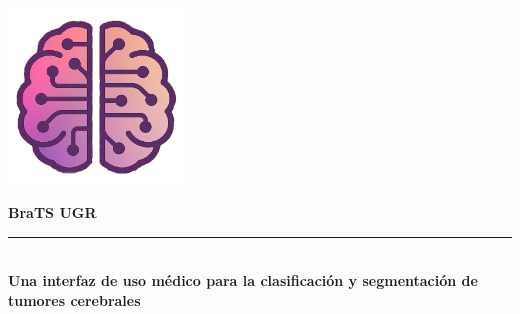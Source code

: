 \begin{titlepage}
 
 
\setlength{\centeroffset}{-0.5\oddsidemargin}
\addtolength{\centeroffset}{0.5\evensidemargin}
\thispagestyle{empty}

\noindent\hspace*{\centeroffset}\begin{minipage}{\textwidth}

\centering

% 

 \vspace{3.3cm}

\includegraphics[width=0.35\textwidth]{imagenes/icono.png}
 \vspace{0.5cm}


{\Huge\bfseries BraTS UGR\\
}
\noindent\rule[-1ex]{\textwidth}{3pt}\\[3.5ex]
{\large\bfseries Una interfaz de uso médico para la clasificación y segmentación de tumores cerebrales \\[4cm]}
\end{minipage}

\vspace{2.5cm}
\noindent\hspace*{\centeroffset}\begin{minipage}{\textwidth}
\centering

\end{minipage}

 
\end{titlepage}


